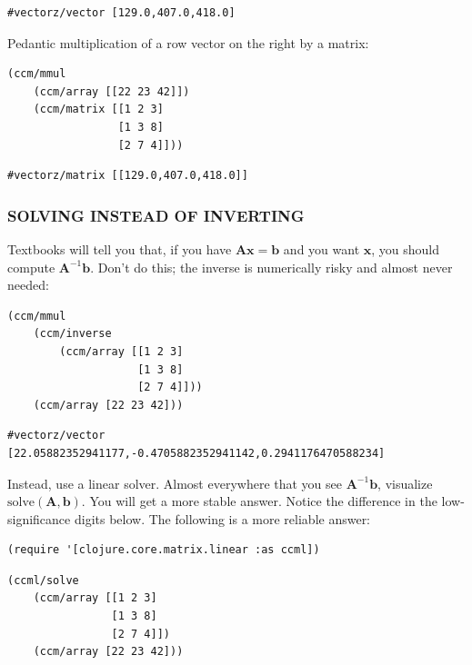 \documentclass[10pt,oneside,x11names]{article}
\begin{document}
\begin{verbatim}
#vectorz/vector [129.0,407.0,418.0]
\end{verbatim}


Pedantic multiplication of a row vector on the right by a matrix:

\begin{verbatim}
(ccm/mmul
    (ccm/array [[22 23 42]])
    (ccm/matrix [[1 2 3]
                 [1 3 8]
                 [2 7 4]]))
\end{verbatim}

\begin{verbatim}
#vectorz/matrix [[129.0,407.0,418.0]]
\end{verbatim}

\subsubsection{SOLVING INSTEAD OF INVERTING}
\label{solving-instead-of-inverting}
Textbooks will tell you that, if you have
\(\boldsymbol{A}\boldsymbol{x}=\boldsymbol{b}\) and you want
\(\boldsymbol{x}\), you should compute
\(\boldsymbol{A}^{-1}\boldsymbol{b}\). Don't do this; the inverse is
numerically risky and almost never needed:

\begin{verbatim}
(ccm/mmul
    (ccm/inverse
        (ccm/array [[1 2 3]
                    [1 3 8]
                    [2 7 4]]))
    (ccm/array [22 23 42]))
\end{verbatim}

\begin{verbatim}
#vectorz/vector [22.05882352941177,-0.4705882352941142,0.2941176470588234]
\end{verbatim}


Instead, use a linear solver. Almost everywhere that you see
\(\boldsymbol{A}^{-1}\boldsymbol{b}\), visualize
\(\text{solve}(\boldsymbol{A},\boldsymbol{b})\). You will get a more
stable answer. Notice the difference in the low-significance digits
below. The following is a more reliable answer:

\begin{verbatim}
(require '[clojure.core.matrix.linear :as ccml])
\end{verbatim}

\begin{verbatim}
(ccml/solve
    (ccm/array [[1 2 3]
                [1 3 8]
                [2 7 4]])
    (ccm/array [22 23 42]))
\end{verbatim}
\end{document}
